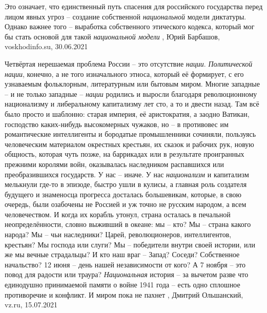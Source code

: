 Это означает, что единственный путь спасения для российского государства перед
лицом явных угроз – создание собственной \emph{национальной} модели диктатуры. Однако
важнее того – выработка собственного этического кодекса, который мог бы стать
основой для такой \emph{национальной модели}
, 
Юрий Барбашов, voskhodinfo.su, 30.06.2021

Четвёртая нерешаемая проблема России – это отсутствие \emph{нации}.
\emph{Политической нации}, конечно, а не того изначального этноса, который её
формирует, с его узнаваемым фольклорным, литературным или бытовым миром. Многие
западные – и не только западные – \emph{нации} родились и выросли благодаря
революционному национализму и либеральному капитализму лет сто, а то и двести
назад. Там всё было просто и шаблонно: старая империя, её аристократия, а
заодно Ватикан, господство каких-нибудь высокомерных чужаков, но – в противовес
им романтические интеллигенты и бородатые промышленники сочиняли, пользуясь
человеческим материалом окрестных крестьян, их сказок и рабочих рук, новую
общность, которая чуть позже, на баррикадах или в результате проигранных
прежними королями войн, оказывалась наследником распавшихся или преобразившихся
государств. У нас – иначе. У нас \emph{национализм} и капитализм мелькнули где-то в
эпизоде, быстро ушли в кулисы, а главная роль создателя будущего и знаменосца
прогресса досталась большевикам, которые, в свою очередь, были озабочены не
Россией и уж точно не русским народом, а всем человечеством. И когда их корабль
утонул, страна осталась в печальной неопределённости, словно выживший в океане:
мы – кто? Мы – страна какого народа? Мы – чьи наследники? Царей,
революционеров, интеллигентов, крестьян? Мы господа или слуги? Мы – победители
внутри своей истории, или же мы вечные страдальцы? И кто наш враг – Запад?
Соседи? Собственное начальство? 12 июня – день нашей независимости от кого? А 7
ноября – это повод для радости или траура? \emph{Национальная} история – за вычетом
разве что единодушно принимаемой памяти о войне 1941 года – есть одно сплошное
противоречие и конфликт. И миром пока не пахнет
, 
Дмитрий Ольшанский, vz.ru, 15.07.2021

